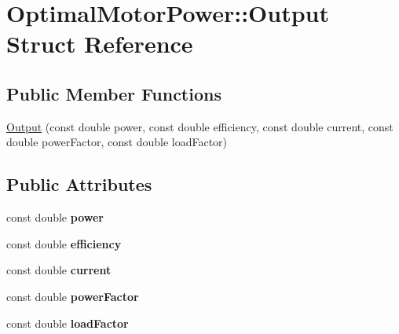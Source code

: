 \hypertarget{struct_optimal_motor_power_1_1_output}{}\section{Optimal\+Motor\+Power\+:\+:Output Struct Reference}
\label{struct_optimal_motor_power_1_1_output}
\subsection*{Public Member Functions}
\begin{DoxyCompactItemize}
\item 
\hyperlink{struct_optimal_motor_power_1_1_output_abbafcda40828d58548d0245d45cd7477}{Output} (const double power, const double efficiency, const double current, const double power\+Factor, const double load\+Factor)
\end{DoxyCompactItemize}
\subsection*{Public Attributes}
\begin{DoxyCompactItemize}
\item 
\mbox{\label{struct_optimal_motor_power_1_1_output_a2848225247934e5029fe3748e9c96682}} 
const double {\bfseries power}
\item 
\mbox{\label{struct_optimal_motor_power_1_1_output_ae7a0621dd6230bd92ebcba7ce81b12c6}} 
const double {\bfseries efficiency}
\item 
\mbox{\label{struct_optimal_motor_power_1_1_output_ae096d9691f71779d58f3f17e7faf5c00}} 
const double {\bfseries current}
\item 
\mbox{\label{struct_optimal_motor_power_1_1_output_aa02432d4d75c11c7e0050546d6f8d92c}} 
const double {\bfseries power\+Factor}
\item 
\mbox{\label{struct_optimal_motor_power_1_1_output_a7e7a6a07ece8a9332a19437ffee19730}} 
const double {\bfseries load\+Factor}
\end{DoxyCompactItemize}


